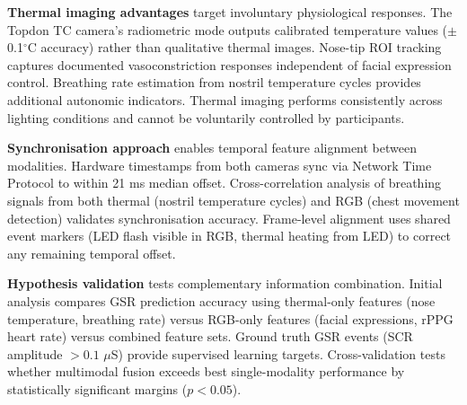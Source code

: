 \textbf{Thermal imaging advantages} target involuntary physiological responses. The Topdon TC camera's radiometric mode outputs calibrated temperature values ($\pm$0.1$^\circ$C accuracy) rather than qualitative thermal images. Nose-tip ROI tracking captures documented vasoconstriction responses independent of facial expression control. Breathing rate estimation from nostril temperature cycles provides additional autonomic indicators. Thermal imaging performs consistently across lighting conditions and cannot be voluntarily controlled by participants.

\textbf{Synchronisation approach} enables temporal feature alignment between modalities. Hardware timestamps from both cameras sync via Network Time Protocol to within 21 ms median offset. Cross-correlation analysis of breathing signals from both thermal (nostril temperature cycles) and RGB (chest movement detection) validates synchronisation accuracy. Frame-level alignment uses shared event markers (LED flash visible in RGB, thermal heating from LED) to correct any remaining temporal offset.

\textbf{Hypothesis validation} tests complementary information combination. Initial analysis compares GSR prediction accuracy using thermal-only features (nose temperature, breathing rate) versus RGB-only features (facial expressions, rPPG heart rate) versus combined feature sets. Ground truth GSR events (SCR amplitude $>0.1$ $\mu$S) provide supervised learning targets. Cross-validation tests whether multimodal fusion exceeds best single-modality performance by statistically significant margins ($p < 0.05$).

